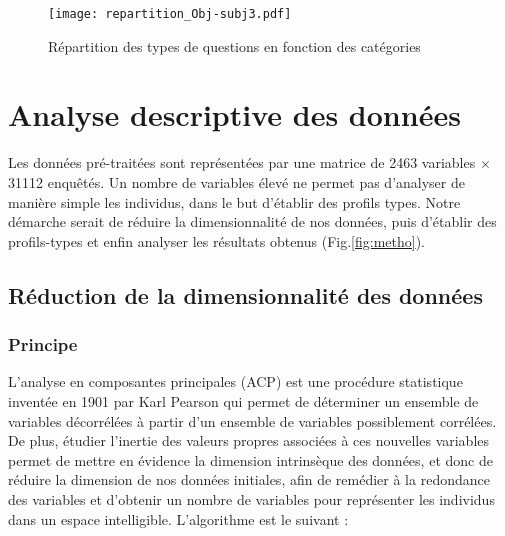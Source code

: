 \documentclass[11pt,fleqn,openany,frenchb]{book} %
\begin{document}
\begin{figure}[!h]
\center
\texttt{[image: repartition\_Obj-subj3.pdf]}
\caption{Répartition des types de questions en fonction des catégories}
\label{fig:repar_objsubj}
\end{figure}

\chapter{Analyse descriptive des données}
Les données pré-traitées sont représentées par une matrice de 2463 variables $\times$ 31112 enquêtés. Un nombre de variables élevé ne permet pas d'analyser de manière simple les individus, dans le but d'établir des profils types. Notre démarche serait de réduire la dimensionnalité de nos données, puis d'établir des profils-types et enfin analyser les résultats obtenus (Fig.\ref{fig:metho}). 
\section{Réduction de la dimensionnalité des données}
\subsection{Principe}
L'analyse en composantes principales (ACP) est une procédure statistique inventée en 1901 par Karl Pearson qui permet de déterminer un ensemble de variables décorrélées à partir d'un ensemble de variables possiblement corrélées. De plus, étudier l'inertie des valeurs propres associées à ces nouvelles variables permet de mettre en évidence la dimension intrinsèque des données, et donc de réduire la dimension de nos données initiales, afin de remédier à la redondance des variables et d'obtenir un nombre de variables pour représenter les individus dans un espace intelligible. L'algorithme est le suivant : \vspace{0.2cm}\par
\end{document}
